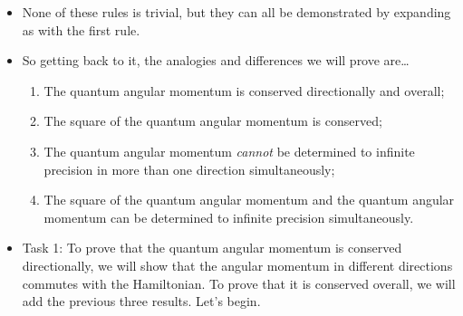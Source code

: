 \documentclass[../notes.tex]{subfiles}
\begin{document}
\begin{itemize}
\begin{enumerate}
\begin{proof}
\begin{align*}
                &= \hat{A}[\hat{A},\hat{B}]+[\hat{A},\hat{B}]\hat{A}
            \end{align*}
            \vspace{-1.5em}
        \end{proof}
        \item $[\hat{A}\hat{B},\hat{C}]=\hat{A}[\hat{B},\hat{C}]+[\hat{A},\hat{C}]\hat{B}$.
        \item $[\hat{A},\hat{B}\hat{C}]=\hat{B}[\hat{A},\hat{C}]+[\hat{A},\hat{B}]\hat{C}$.
        \item Bilinearity, i.e.,
        \begin{align*}
            [\hat{A}+\hat{B},\hat{C}] &= [\hat{A},\hat{C}]+[\hat{B},\hat{C}]&
                [c\hat{A},\hat{B}] &= c[\hat{A},\hat{B}]\\
            [\hat{A},\hat{B}+\hat{C}] &= [\hat{A},\hat{B}]+[\hat{A},\hat{C}]&
                [\hat{A},c\hat{B}] &= c[\hat{A},\hat{B}]
        \end{align*}
    \end{enumerate}
    \item None of these rules is trivial, but they can all be demonstrated by expanding as with the first rule.
    \item So getting back to it, the analogies and differences we will prove are\dots
    \begin{enumerate}
        \item The quantum angular momentum is conserved directionally and overall;
        \item The square of the quantum angular momentum is conserved;
        \item The quantum angular momentum \emph{cannot} be determined to infinite precision in more than one direction simultaneously;
        \item The square of the quantum angular momentum and the quantum angular momentum can be determined to infinite precision simultaneously.
    \end{enumerate}
    \item Task 1: To prove that the quantum angular momentum is conserved directionally, we will show that the angular momentum in different directions commutes with the Hamiltonian. To prove that it is conserved overall, we will add the previous three results. Let's begin.

\end{itemize}
\end{document}
